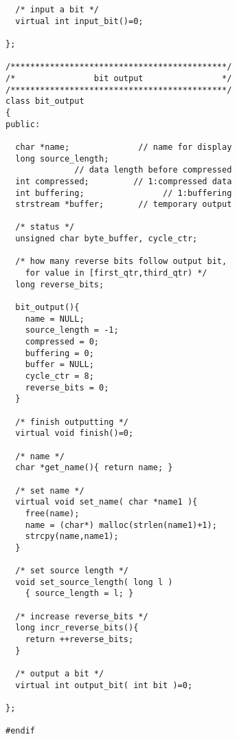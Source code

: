 \begin{verbatim}
  /* input a bit */
  virtual int input_bit()=0;

};

/********************************************/
/*                bit output                */
/********************************************/
class bit_output
{
public:

  char *name;              // name for display
  long source_length;
              // data length before compressed
  int compressed;         // 1:compressed data
  int buffering;                // 1:buffering
  strstream *buffer;       // temporary output

  /* status */
  unsigned char byte_buffer, cycle_ctr;

  /* how many reverse bits follow output bit,
    for value in [first_qtr,third_qtr) */
  long reverse_bits;

  bit_output(){
    name = NULL;
    source_length = -1;
    compressed = 0;
    buffering = 0;
    buffer = NULL;
    cycle_ctr = 8;
    reverse_bits = 0;
  }

  /* finish outputting */
  virtual void finish()=0;

  /* name */
  char *get_name(){ return name; }

  /* set name */
  virtual void set_name( char *name1 ){
    free(name);
    name = (char*) malloc(strlen(name1)+1);
    strcpy(name,name1);
  }

  /* set source length */
  void set_source_length( long l )
    { source_length = l; }

  /* increase reverse_bits */
  long incr_reverse_bits(){
    return ++reverse_bits;
  }

  /* output a bit */
  virtual int output_bit( int bit )=0;

};

#endif
\end{verbatim}
